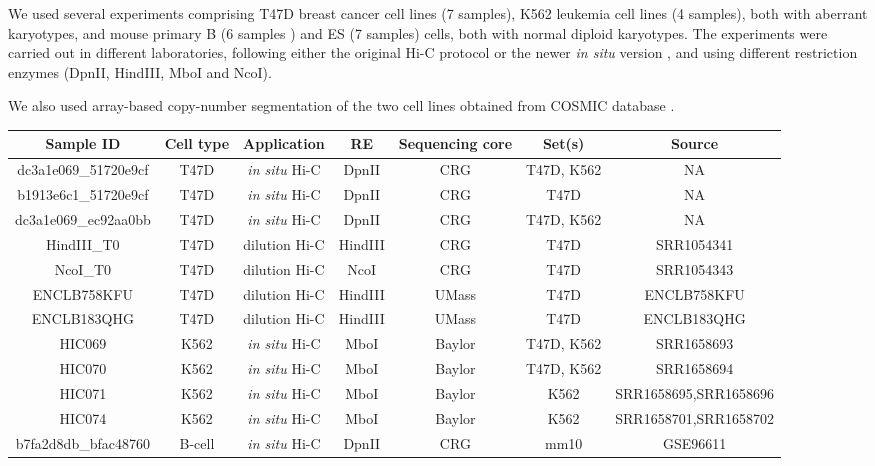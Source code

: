 \documentclass{bioinfo}
\begin{document}
\begin{methods}
We used several experiments comprising T47D breast cancer cell
lines (7 samples), K562 leukemia cell lines (4 samples), both with
aberrant karyotypes, and mouse primary B (6 samples ) and ES (7 samples)
cells, both with normal diploid karyotypes. The experiments were carried
out in different laboratories, following either the original Hi-C protocol
\citep{lieberman2009comprehensive} or the newer \textit{in situ} version
\citep{rao20143d}, and using different restriction enzymes (DpnII,
HindIII, MboI and NcoI).

We also used array-based copy-number segmentation of the two cell
lines obtained from COSMIC database \citep{forbes2010cosmic}.
 
\begin{table}
{\begin{tabular}{ccccccc}
  \toprule
  \textbf{Sample ID} & \textbf{Cell type} & \textbf{Application} &
  \textbf{RE} & \textbf{Sequencing core} & \textbf{Set(s)} &
  \textbf{Source} \\
  \midrule
dc3a1e069\_51720e9cf & T47D & \textit{in situ} Hi-C &
  DpnII & CRG & T47D, K562 & NA \\
b1913e6c1\_51720e9cf & T47D & \textit{in situ} Hi-C &
  DpnII & CRG & T47D & NA \\
dc3a1e069\_ec92aa0bb & T47D & \textit{in situ} Hi-C &
  DpnII & CRG & T47D, K562 & NA \\
HindIII\_T0 & T47D & dilution Hi-C &
  HindIII & CRG & T47D & SRR1054341 \\
NcoI\_T0    & T47D & dilution Hi-C &
  NcoI      & CRG & T47D & SRR1054343 \\
ENCLB758KFU & T47D & dilution Hi-C &
  HindIII   & UMass & T47D & ENCLB758KFU \\
ENCLB183QHG & T47D & dilution Hi-C &
  HindIII   & UMass & T47D & ENCLB183QHG \\
HIC069  & K562 & \textit{in situ} Hi-C &
  MboI & Baylor & T47D, K562 &    SRR1658693 \\
HIC070  & K562 & \textit{in situ} Hi-C &
  MboI & Baylor & T47D, K562 &    SRR1658694 \\
HIC071  & K562 & \textit{in situ} Hi-C &
  MboI & Baylor & K562 & SRR1658695,SRR1658696 \\
HIC074  & K562 & \textit{in situ} Hi-C &
  MboI & Baylor & K562 & SRR1658701,SRR1658702 \\
b7fa2d8db\_bfac48760 & B-cell  & \textit{in situ} Hi-C &
  DpnII & CRG & mm10 & GSE96611 \\

\end{tabular}}
\end{table}
\end{methods}
\end{document}
